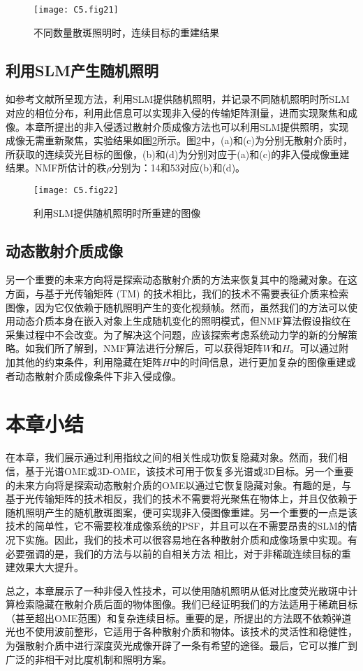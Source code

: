 \begin{figure}[htp]
	\centering
	\texttt{[image: C5.fig21]}
	\caption{不同数量散斑照明时，连续目标的重建结果}
	\label{fig:5.21}
\end{figure}

\subsection{利用SLM产生随机照明}

如参考文献\cite{boniface_non_invasive_2020}所呈现方法，利用SLM提供随机照明，并记录不同随机照明时所SLM对应的相位分布，利用此信息可以实现非入侵的传输矩阵测量，进而实现聚焦和成像。本章所提出的非入侵透过散射介质成像方法也可以利用SLM提供照明，实现成像无需重新聚焦，实验结果如图\ref{fig:5.22}所示。图\ref{fig:5.22}中，(a)和(c)为分别无散射介质时，所获取的连续荧光目标的图像，(b)和(d)为分别对应于(a)和(c)的非入侵成像重建结果。NMF所估计的秩$\rho$分别为：14和53对应(b)和(d)。

\begin{figure}[htp]
	\centering
	\texttt{[image: C5.fig22]}
	\caption{利用SLM提供随机照明时所重建的图像}
	\label{fig:5.22}
\end{figure}

\subsection{动态散射介质成像}

另一个重要的未来方向将是探索动态散射介质的方法来恢复其中的隐藏对象。在这方面，与基于光传输矩阵 (TM) 的技术相比，我们的技术不需要表征介质来检索图像，因为它仅依赖于随机照明产生的变化视频帧。然而，虽然我们的方法可以使用动态介质本身在嵌入对象上生成随机变化的照明模式，但NMF算法假设指纹在采集过程中不会改变。为了解决这个问题，应该探索考虑系统动力学的新的分解策略。如我们所了解到，NMF算法进行分解后，可以获得矩阵$W$和$H$。可以通过附加其他的约束条件，利用隐藏在矩阵$H$中的时间信息，进行更加复杂的图像重建或者动态散射介质成像条件下非入侵成像。

\section{本章小结}

在本章，我们展示通过利用指纹之间的相关性成功恢复隐藏对象。然而，我们相信，基于光谱OME或3D-OME，该技术可用于恢复多光谱或3D目标。另一个重要的未来方向将是探索动态散射介质的OME以通过它恢复隐藏对象。有趣的是，与基于光传输矩阵的技术相反，我们的技术不需要将光聚焦在物体上，并且仅依赖于随机照明产生的随机散斑图案，便可实现非入侵图像重建。另一个重要的一点是该技术的简单性，它不需要校准成像系统的PSF\cite{Antipa2018}，并且可以在不需要昂贵的SLM的情况下实施。因此，我们的技术可以很容易地在各种散射介质和成像场景中实现。有必要强调的是，我们的方法与以前的自相关方法 \cite{bertolotti_non-invasive_2012,katz_non-invasive_2014} 相比，对于非稀疏连续目标的重建效果大大提升。

总之，本章展示了一种非侵入性技术，可以使用随机照明从低对比度荧光散斑中计算检索隐藏在散射介质后面的物体图像。我们已经证明我们的方法适用于稀疏目标（甚至超出OME范围）和复杂连续目标。重要的是，所提出的方法既不依赖弹道光也不使用波前整形，它适用于各种散射介质和物体。该技术的灵活性和稳健性，为强散射介质中进行深度荧光成像开辟了一条有希望的途径。最后，它可以推广到广泛的非相干对比度机制和照明方案。
